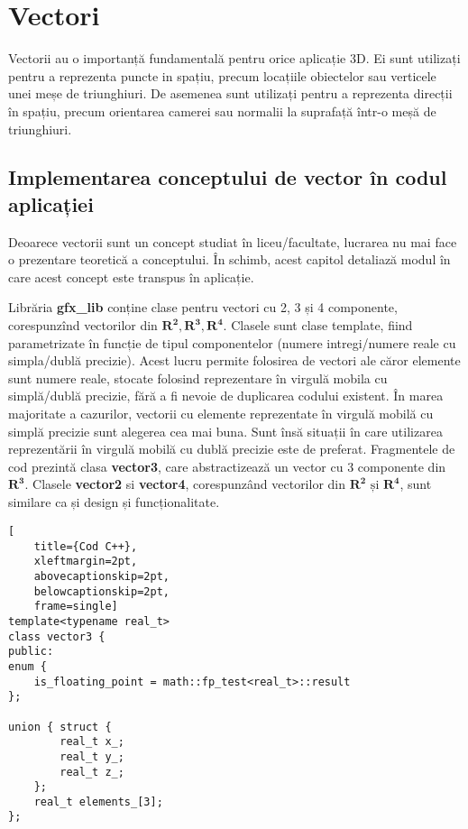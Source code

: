 \section{Vectori}
\label{ch1:sec_vectors}
\indent

Vectorii au o importanță fundamentală pentru orice aplicație 3D. Ei sunt
utilizați pentru a reprezenta puncte in spațiu, precum locațiile obiectelor sau
verticele unei meșe de triunghiuri. De asemenea sunt utilizați pentru a
reprezenta direcții în spațiu, precum orientarea camerei sau normalii la
suprafață într-o meșă de triunghiuri.

\subsection{Implementarea conceptului de vector în codul aplicației}
\label{ch1:sec_vectors:sub_properties}
\indent

Deoarece vectorii sunt un concept studiat în liceu/facultate, lucrarea nu mai 
face o prezentare teoretică a conceptului. În schimb, acest capitol detaliază 
modul în care acest concept este transpus în aplicație.

Librăria \textbf{gfx\_lib} conține clase pentru vectori cu 2, 3 și 4 componente, 
corespunzînd vectorilor din $\mathbf{R^2, R^3, R^4}$. Clasele sunt clase template, 
fiind parametrizate în funcție de tipul componentelor (numere intregi/numere 
reale cu simpla/dublă precizie).
Acest lucru permite folosirea de vectori ale căror elemente sunt numere reale, 
stocate folosind reprezentare în virgulă mobila cu simplă/dublă precizie, fără a
fi nevoie de duplicarea codului existent. În marea majoritate a cazurilor, 
vectorii cu elemente reprezentate în virgulă mobilă cu simplă precizie sunt 
alegerea cea mai buna. Sunt însă situații în care utilizarea reprezentării în 
virgulă mobilă cu dublă precizie este de preferat.
Fragmentele de cod prezintă clasa \textbf{vector3}, care
abstractizează un vector cu 3 componente din $\mathbf{R^3}$. Clasele
\textbf{vector2} si \textbf{vector4}, corespunzând vectorilor din 
$\mathbf{R^2} \text{ și } \mathbf{R^4}$, sunt similare ca și design și 
funcționalitate.

\begin{lstlisting}[
    title={Cod C++}, 
    xleftmargin=2pt,
    abovecaptionskip=2pt,
    belowcaptionskip=2pt,
    frame=single]
template<typename real_t>
class vector3 {
public:
enum {
    is_floating_point = math::fp_test<real_t>::result
};

union { struct {
        real_t x_;
        real_t y_;
        real_t z_;
    };
    real_t elements_[3];
};
\end{lstlisting}

